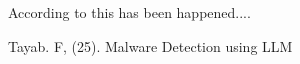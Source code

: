 \documentclass{article}
\begin{document}
According to \cite{tayab25} this has been happened....

\begin{thebibliography}{10}
    Tayab. F, (25). Malware Detection using LLM
\end{thebibliography}
\end{document}
